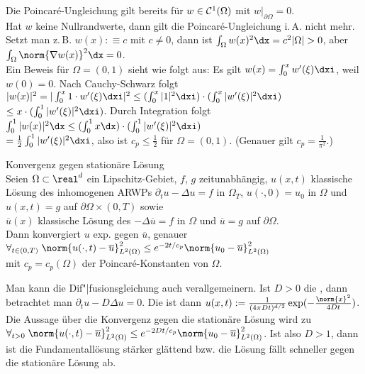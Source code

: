 \begin{Bem}
    Die Poincaré-Ungleichung gilt bereits für $w \in \mathcal{C}^1(\Omega)$ mit $w|_{\partial\Omega} = 0$.\\
    Hat $w$ keine Nullrandwerte, dann gilt die Poincaré-Ungleichung i.\,A. nicht mehr.
    Setzt man z.\,B. $w(x) :\equiv c$ mit $c \not= 0$,
    dann ist $\int_\Omega w(x)^2 \dx = c^2 |\Omega| > 0$, aber
    $\int_\Omega \norm{\nabla w(x)}^2 \dx = 0$.\\
    Ein Beweis für $\Omega = (0, 1)$ sieht wie folgt aus:
    Es gilt $w(x) = \int_0^x w'(\xi) \dxi$, weil $w(0) = 0$.
    Nach Cauchy-Schwarz folgt
    $|w(x)|^2 = |\int_0^x 1 \cdot w'(\xi) \dxi|^2
    \le (\int_0^x |1|^2 \dxi) \cdot (\int_0^x |w'(\xi)|^2 \dxi)$\\
    $\le x \cdot (\int_0^1 |w'(\xi)|^2 \dxi)$.
    Durch Integration folgt
    $\int_0^1 |w(x)|^2 \dx \le (\int_0^1 x \dx) \cdot (\int_0^1 |w'(\xi)|^2 \dxi)$\\
    $= \frac{1}{2} \int_0^1 |w'(\xi)|^2 \dxi$,
    also ist $c_p \le \frac{1}{2}$ für $\Omega = (0, 1)$.
    (Genauer gilt $c_p = \frac{1}{\pi^2}$.)
\end{Bem}

\linie

\begin{Satz}{Konvergenz gegen stationäre Lösung}\\
    Seien $\Omega \subset \real^d$ ein Lipschitz-Gebiet,
    $f$, $g$ zeitunabhängig,
    $u(x, t)$ klassische Lösung des inhomogenen ARWPs
    $\partial_t u - \Delta u = f$ in $\Omega_T$,
    $u(\cdot, 0) = u_0$ in $\Omega$ und $u(x, t) = g$ auf $\partial\Omega \times (0, T)$
    sowie\\
    $\overline{u}(x)$ klassische Lösung des 
    $-\Delta\overline{u} = f$ in $\Omega$ und $\overline{u} = g$ auf $\partial\Omega$.\\
    Dann konvergiert $u$ exp. gegen $\overline{u}$, genauer
    $\forall_{t \in (0, T)}\; \norm{u(\cdot, t) - \overline{u}}_{L^2(\Omega)}^2 \le
    e^{-2t/c_p} \norm{u_0 - \overline{u}}_{L^2(\Omega)}^2$\\
    mit $c_p = c_p(\Omega)$ der Poincaré-Konstanten von $\Omega$.
\end{Satz}

\linie

\begin{Bem}
    Man kann die Dif"|fusionsgleichung auch verallgemeinern.
    Ist $D > 0$ die , dann betrachtet man
    $\partial_t u - D\Delta u = 0$.
    Die  ist dann
    $u(x, t) := \frac{1}{(4\pi Dt)^{d/2}} \exp(-\frac{\norm{x}^2}{4Dt})$.
    Die Aussage über die Konvergenz gegen die stationäre Lösung wird zu
    $\forall_{t > 0}\; \norm{u(\cdot, t) - \overline{u}}_{L^2(\Omega)}^2 \le
    e^{-2Dt/c_p} \norm{u_0 - \overline{u}}_{L^2(\Omega)}^2$.
    Ist also $D > 1$, dann ist die Fundamentallösung stärker glättend bzw.
    die Lösung fällt schneller gegen die stationäre Lösung ab.
\end{Bem}

